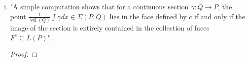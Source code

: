 \documentclass[11pt]{article}
\DeclareMathOperator{\vol}{vol}
\begin{document}
\begin{enumerate}
\begin{enumerate}[(i)]
\begin{proof}
(CLAIM: THE SET OF GENERIC c IS IN GENERAL POSITION)
\end{proof}


\item "A simple computation shows that for a continuous section $\gamma:Q \rightarrow P$, the point $\frac{1}{\vol(Q)}\int \gamma dx \in \Sigma(P,Q)$ lies in the face defined by $c$ if and only if the image of the section is entirely contained in the collection of faces $F^c \subseteq L(P)$".

\begin{proof}

\end{proof}


\end{enumerate}


\end{enumerate}
\end{document}
